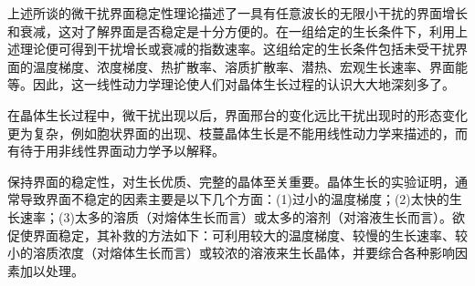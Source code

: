 上述所谈的微干扰界面稳定性理论描述了一具有任意波长的无限小干扰的界面增长和衰减，这对了解界面是否稳定是十分方便的。在一组给定的生长条件下，利用上述理论便可得到干扰增长或衰减的指数速率。这组给定的生长条件包括未受干扰界面的温度梯度、浓度梯度、热扩散率、溶质扩散率、潜热、宏观生长速率、界面能等。因此，这一线性动力学理论使人们对晶体生长过程的认识大大地深刻多了。

在晶体生长过程中，微干扰出现以后，界面邢台的变化远比干扰出现时的形态变化更为复杂，例如胞状界面的出现、枝蔓晶体生长是不能用线性动力学来描述的，而有待于用非线性界面动力学予以解释。

保持界面的稳定性，对生长优质、完整的晶体至关重要。晶体生长的实验证明，通常导致界面不稳定的因素主要是以下几个方面：(1)过小的温度梯度；(2)太快的生长速率；(3)太多的溶质（对熔体生长而言）或太多的溶剂（对溶液生长而言）。欲促使界面稳定，其补救的方法如下：可利用较大的温度梯度、较慢的生长速率、较小的溶质浓度（对熔体生长而言）或较浓的溶液来生长晶体，并要综合各种影响因素加以处理。